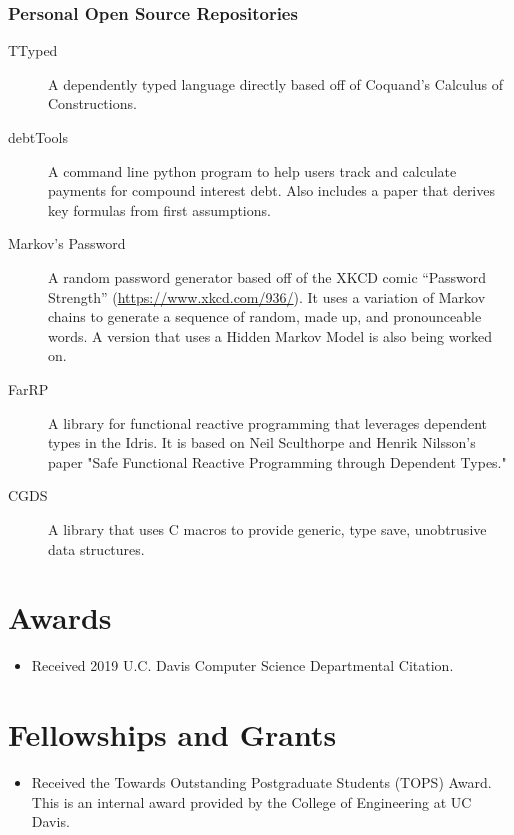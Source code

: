 \documentclass{resume}
\begin{document}
\subsubsection*{Personal Open Source Repositories}

\begin{description}
    \item[TTyped] A dependently typed language directly based off of
        Coquand's Calculus of Constructions.

    \item[debtTools] A command line python program to help users track
        and calculate payments for compound interest debt.
        Also includes a paper that derives key formulas from first
        assumptions.

    \item[Markov's Password] A random password generator based off of
        the XKCD comic ``Password Strength''
        (\url{https://www.xkcd.com/936/}).
        It uses a variation of Markov chains to generate a sequence of
        random, made up, and pronounceable words.
        A version that uses a Hidden Markov Model is also being worked
        on.

    \item[FarRP] A library for functional reactive programming that
        leverages dependent types in the Idris.
        It is based on Neil Sculthorpe and Henrik Nilsson's paper "Safe
        Functional Reactive Programming through Dependent Types."

    \item[CGDS] A library that uses C macros to provide generic, type save,
        unobtrusive data structures.
\end{description}


\section*{Awards}

\begin{itemize}
    \item Received 2019 U.C. Davis Computer Science Departmental Citation.
\end{itemize}

\section*{Fellowships and Grants}

\begin{itemize}
\item Received the Towards Outstanding Postgraduate Students (TOPS) Award.
  This is an internal award provided by the College of Engineering at UC Davis.
\end{itemize}
\end{document}
